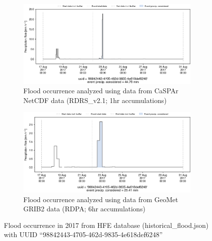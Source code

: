 \documentclass[10pt,a4paper,titlepage,parskip]{scrartcl}
\begin{document}
\begin{figure}[h]
	\begin{subfigure}[a]{1.0\textwidth}
		\centering
		\includegraphics[width=\linewidth]{figures/compare_Geomet_CaSPAr/interpolated_at_stations_occurrence_965_identified-timesteps_RDRS_v2.1.png}
		\caption{Flood occurrence analyzed using data from CaSPAr NetCDF data (RDRS\_v2.1; 1hr accumulations)}
	\end{subfigure}
	\par\bigskip\bigskip
	\begin{subfigure}[b]{1.0\textwidth}
		\centering
		\includegraphics[width=\linewidth]{figures/compare_Geomet_CaSPAr/interpolated_at_stations_occurrence_965_identified-timesteps_rdpa:10km:6f.png}
		\caption{Flood occurrence analyzed using data from GeoMet GRIB2 data (RDPA; 6hr accumulations)}
	\end{subfigure}
	\par\bigskip\bigskip
	\caption{Flood occurrence in 2017 from HFE database (historical\_flood.json) with UUID ``98842443-4705-462d-9835-4e618def6248''}
\end{figure}
\pagebreak
\end{document}
